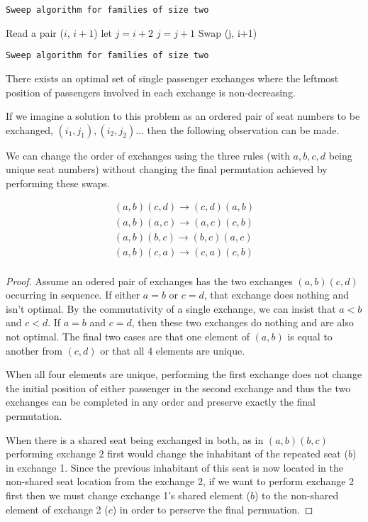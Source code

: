 \documentclass[11pt,twocolumn]{article}
\begin{document}
\begin{algorithm}
\caption{ \texttt{Sweep algorithm for families of size two} }
\label{alg:twoSweep}
  \begin{algorithmic}
  \State Read a pair ($i$, $i+1$) 
   \State let $j = i+2$
      $j = j + 1$
   \EndWhile
   \State Swap (j, i+1)
  \EndIf
\EndWhile
\caption{ \texttt{Sweep algorithm for families of size two} }
\end{algorithmic}
\end{algorithm}
\FloatBarrier

\begin{thm} \label{thm:sweepCorrectness}
There exists an optimal set of single passenger exchanges where the leftmost position of passengers involved in each exchange is non-decreasing.
\end{thm}


If we imagine a solution to this problem as an ordered pair of seat numbers to be exchanged, $(i_1,j_1), (i_2,j_2)...$ then the following observation can be made. 

\begin{lem} \label{lem:swapRules} 
We can change the order of exchanges using the three rules (with $a,b,c,d$ being unique seat numbers) without changing the final permutation achieved by performing these swaps.

\begin{eqnarray*}
(a,b) (c,d) \rightarrow (c,d) (a,b) \\
(a,b) (a,c) \rightarrow (a,c) (c,b) \\
(a,b) (b,c) \rightarrow (b,c) (a,c) \\
(a,b) (c,a) \rightarrow (c,a) (c,b) \\
\end{eqnarray*}
\end{lem}

\begin{proof}
Assume an odered pair of exchanges has the two exchanges $(a,b) (c,d)$ occurring in sequence. If either $a=b$ or $c=d$, that exchange does nothing and isn't optimal.  By the commutativity of a single exchange, we can insist that $a<b$ and $c<d$.  If $a=b$ and $c=d$, then these two exchanges do nothing and are also not optimal.  The final two cases are that one element of $(a,b)$ is equal to another from $(c,d)$ or that all 4 elements are unique.

When all four elements are unique, performing the first exchange does not change the initial position of either passenger in the second exchange and thus the two exchanges can be completed in any order and preserve exactly the final permutation.

When there is a shared seat being exchanged in both, as in $(a,b) (b,c)$ performing exchange 2 first would change the inhabitant of the repeated seat ($b$) in exchange 1.  Since the previous inhabitant of this seat is now located in the non-shared seat location from the exchange 2, if we want to perform exchange 2 first then we must change exchange 1's shared element ($b$) to the non-shared element of exchange 2 ($c$) in order to perserve the final permuation.
\end{proof}
\end{document}
